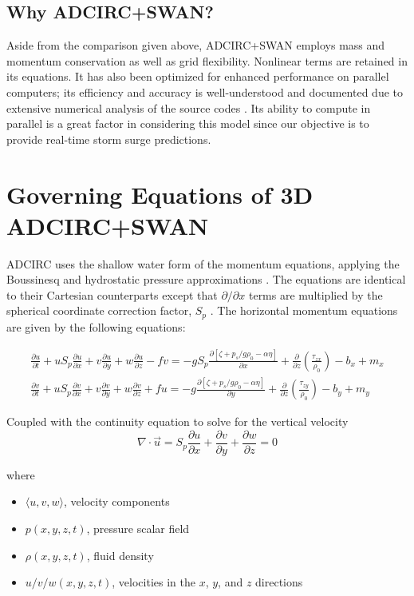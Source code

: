 \documentclass[a4paper, 10pt]{article}
\begin{document}
	\subsection{Why ADCIRC+SWAN?}
	Aside from the comparison given above, ADCIRC+SWAN employs mass and momentum conservation as well as grid flexibility. Nonlinear terms are retained in its equations. It has also been optimized for enhanced performance on parallel computers; its efficiency and accuracy is well-understood and documented due to extensive numerical analysis of the source codes \cite{bib:adcirc}. Its ability to compute in parallel is a great factor in considering this model since our objective is to provide real-time storm surge predictions.
	
	\section{Governing Equations of 3D ADCIRC+SWAN}
	ADCIRC uses the shallow water form of the momentum equations, applying the Boussinesq and hydrostatic pressure approximations \cite{bib:num}. 
	The equations are identical to their Cartesian counterparts except that $\partial/\partial x$ terms are multiplied by the spherical coordinate correction factor, $S_p$ \cite{bib:num}. The horizontal momentum equations are given by the following equations:
	
	\begin{align*}
	\frac{\partial u}{\partial t} + u S_p \frac{\partial u}{\partial x} + v \frac{\partial u}{\partial y} + w \frac{\partial u}{\partial z} - fv = -g S_p \frac{\partial \left[\zeta + p_s/g \rho_0 - \alpha \eta\right]}{\partial x} + \frac{\partial}{\partial z} \left(\frac{\tau_{zx}}{\rho_0}\right) - b_x + m_x \\
	\frac{\partial v}{\partial t} + u S_p \frac{\partial v}{\partial x} + v \frac{\partial v}{\partial y} + w \frac{\partial v}{\partial z} + fu = -g \frac{\partial \left[\zeta + p_s/g \rho_0 - \alpha \eta\right]}{\partial y} + \frac{\partial}{\partial z} \left(\frac{\tau_{zy}}{\rho_0}\right) - b_y + m_y
	\label{eqn:sph}
	\end{align*}
	
	Coupled with the continuity equation to solve for the vertical velocity
	\begin{equation*}
	\nabla \cdot \vec{u} = S_p \frac{\partial u}{\partial x} + \frac{\partial v}{\partial y} + \frac{\partial w}{\partial z} = 0
	\end{equation*}
	
	where
	\begin{itemize}
		\item $\langle u, v, w \rangle$, velocity components
		\item $p(x, y, z, t)$, pressure scalar field
		\item $\rho(x, y, z, t)$, fluid density
		\item $u/v/w(x, y, z, t)$, velocities in the $x$, $y$, and $z$ directions
	\end{itemize}
	
\end{document}
